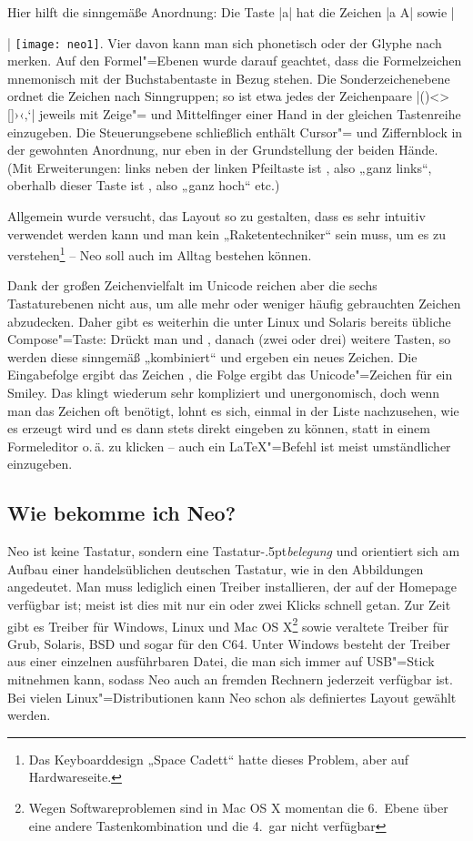 \documentclass[ngerman]{dtk}
\newcommand{\taste}[1]{\makebox{\textsf{#1}}}
\begin{document}
Hier hilft die sinngemäße Anordnung: Die Taste |a| hat die Zeichen |a A| sowie |{| \texttt{[image: neo1]}. Vier davon kann man sich phonetisch oder der Glyphe nach merken. Auf den Formel"=Ebenen wurde darauf geachtet, dass die Formelzeichen mnemonisch mit der Buchstabentaste in Bezug stehen.  Die Sonderzeichenebene ordnet die Zeichen nach Sinngruppen; so ist etwa jedes der Zeichenpaare |()<>{}[]›‹‚‘| jeweils mit Zeige"= und Mittelfinger einer Hand in der gleichen Tastenreihe einzugeben.  Die Steuerungsebene schließlich enthält Cursor"= und Ziffernblock in der gewohnten Anordnung, nur eben in der Grundstellung der beiden Hände. (Mit Erweiterungen: links neben der linken Pfeiltaste ist \taste{Pos 1}, also „ganz links“, oberhalb dieser Taste ist \taste{Bild hoch}, also „ganz hoch“ etc.)

Allgemein wurde versucht, das Layout so zu gestalten, dass es sehr intuitiv verwendet werden kann und man kein „Raketentechniker“ sein muss, um es zu verstehen\footnote{Das Keyboarddesign „Space Cadett“ hatte dieses Problem, aber auf Hardwareseite.} – Neo soll auch im Alltag bestehen können.

Dank der großen Zeichenvielfalt im Unicode reichen aber die sechs Tastaturebenen nicht aus, um alle mehr oder weniger häufig gebrauchten Zeichen abzudecken. Daher gibt es weiterhin die unter Linux und Solaris bereits übliche Compose"=Taste: Drückt man \taste{Mod 3} und \taste{Tab}, danach (zwei oder drei) weitere Tasten, so werden diese sinngemäß „kombiniert“ und ergeben ein neues Zeichen. Die Eingabefolge \taste{Compose a e} ergibt das Zeichen \taste{æ}, die Folge \taste{Compose : )} ergibt das Unicode"=Zeichen für ein Smiley. Das klingt wiederum sehr kompliziert und unergonomisch, doch wenn man das Zeichen oft benötigt, lohnt es sich, einmal in der Liste nachzusehen, wie es erzeugt wird und es dann stets direkt eingeben zu können, statt in einem Formeleditor o.\,ä. zu klicken – auch ein \LaTeX"=Befehl ist meist umständlicher einzugeben.

\subsection{Wie bekomme ich Neo?}
Neo ist keine Tastatur, sondern eine Tastatur\kern -.5pt\emph{belegung} und orientiert sich am Aufbau einer handelsüblichen deutschen Tastatur, wie in den Abbildungen angedeutet. Man muss lediglich einen Treiber installieren, der auf der Homepage verfügbar ist; meist ist dies mit nur ein oder zwei Klicks schnell getan. Zur Zeit gibt es Treiber für Windows, Linux und Mac OS X\footnote{Wegen Softwareproblemen sind in Mac OS X momentan die 6.~Ebene über eine andere Tastenkombination und die 4.~gar nicht verfügbar} sowie veraltete Treiber für Grub, Solaris, BSD und sogar für den C64. Unter Windows besteht der Treiber aus einer einzelnen ausführbaren Datei, die man sich immer auf USB"=Stick mitnehmen kann, sodass Neo auch an fremden Rechnern jederzeit verfügbar ist. Bei vielen Linux"=Distributionen kann Neo schon als definiertes Layout gewählt werden.

}
\end{document}
